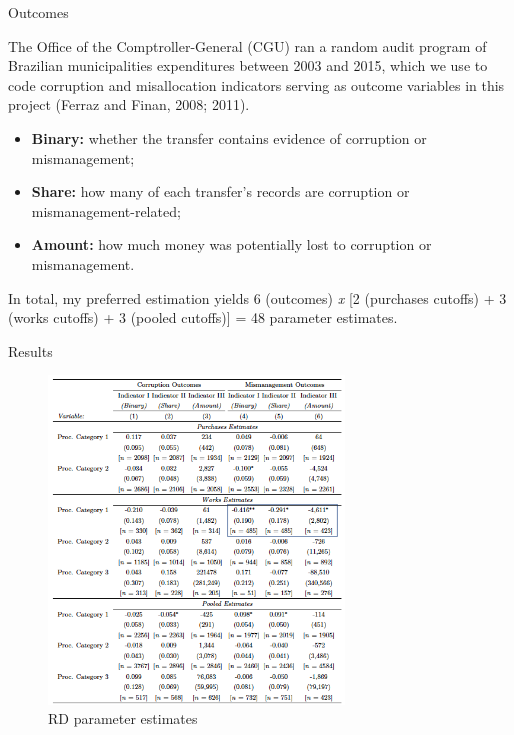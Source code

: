 \documentclass[10pt,ignorenonframetext,]{beamer}
\begin{document}
\begin{frame}{Outcomes}
\protect\hypertarget{outcomes}{}

The Office of the Comptroller-General (CGU) ran a random audit program
of Brazilian municipalities expenditures between 2003 and 2015, which we
use to code corruption and misallocation indicators serving as outcome
variables in this project (Ferraz and Finan, 2008; 2011).

\begin{itemize}
\item
  \textbf{Binary:} whether the transfer contains evidence of corruption
  or mismanagement;
\item
  \textbf{Share:} how many of each transfer's records are corruption or
  mismanagement-related;
\item
  \textbf{Amount:} how much money was potentially lost to corruption or
  mismanagement.
\end{itemize}

In total, my preferred estimation yields 6 (outcomes) \emph{x} {[}2
(purchases cutoffs) + 3 (works cutoffs) + 3 (pooled cutoffs){]} = 48
parameter estimates.

\end{frame}

\begin{frame}{Results}
\protect\hypertarget{results}{}

\begin{figure}
\centering
\includegraphics[width=0.7\textwidth,height=\textheight]{./images/table.png}
\caption{RD parameter estimates}
\end{figure}

\end{frame}
\end{document}
